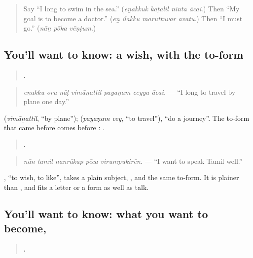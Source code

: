 \label{lesson:TA-C290-poka-acai}



\begin{quote}
Say \textquotedblleft{}I long to swim in the sea.\textquotedblright{} (\emph{eṉakkuk kaṭalil nīnta ācai}.) Then \textquotedblleft{}My goal is to become a doctor.\textquotedblright{} (\emph{eṉ ilakku maruttuvar āvatu}.) Then \textquotedblleft{}I must go.\textquotedblright{} (\emph{nāṉ pōka vēṇṭum}.)
\end{quote}

\subsection*{You'll want to know: a wish, with the to-form}
\begin{quote}
\textbf{      .}
\end{quote}

\begin{quote}
\emph{eṉakku oru nāḷ vimāṉattil payaṇam ceyya ācai.} — \textquotedblleft{}I long to travel by plane one day.\textquotedblright{}
\end{quote}

\textbf{} (\emph{vimāṉattil}, \textquotedblleft{}by plane\textquotedblright{}); \textbf{ } (\emph{payaṇam cey}, \textquotedblleft{}to travel\textquotedblright{}), \textquotedblleft{}do a journey\textquotedblright{}. The to-form that came before \textbf{} comes before \textbf{}: \textbf{ }.

\begin{quote}
\textbf{    .}
\end{quote}

\begin{quote}
\emph{nāṉ tamiḻ naṉṟākap pēca virumpukiṟēṉ.} — \textquotedblleft{}I want to speak Tamil well.\textquotedblright{}
\end{quote}

\textbf{}, \textquotedblleft{}to wish, to like\textquotedblright{}, takes a plain subject, \textbf{}, and the same to-form. It is plainer than \textbf{}, and fits a letter or a form as well as talk.

\subsection*{You'll want to know: what you want to become, }
\begin{quote}
\textbf{   .}
\end{quote}

